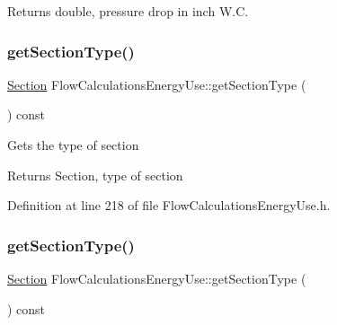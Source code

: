 \begin{DoxyReturn}{Returns}
double, pressure drop in inch W.\+C. 
\end{DoxyReturn}
\mbox{\label{class_flow_calculations_energy_use_ae88cc4f93028907c4c12e8925f63266b}} 
\subsubsection{\texorpdfstring{get\+Section\+Type()}{getSectionType()}\hspace{0.1cm}{\footnotesize\ttfamily [1/3]}}
{\footnotesize\ttfamily \hyperlink{class_flow_calculations_energy_use_afbabab0da698748de91369a5dfc7662a}{Section} Flow\+Calculations\+Energy\+Use\+::get\+Section\+Type (\begin{DoxyParamCaption}{ }\end{DoxyParamCaption}) const\hspace{0.3cm}{\ttfamily [inline]}}

Gets the type of section

\begin{DoxyReturn}{Returns}
Section, type of section 
\end{DoxyReturn}


Definition at line 218 of file Flow\+Calculations\+Energy\+Use.\+h.

\mbox{\label{class_flow_calculations_energy_use_ae88cc4f93028907c4c12e8925f63266b}} 
\subsubsection{\texorpdfstring{get\+Section\+Type()}{getSectionType()}\hspace{0.1cm}{\footnotesize\ttfamily [2/3]}}
{\footnotesize\ttfamily \hyperlink{class_flow_calculations_energy_use_afbabab0da698748de91369a5dfc7662a}{Section} Flow\+Calculations\+Energy\+Use\+::get\+Section\+Type (\begin{DoxyParamCaption}{ }\end{DoxyParamCaption}) const\hspace{0.3cm}{\ttfamily [inline]}}

